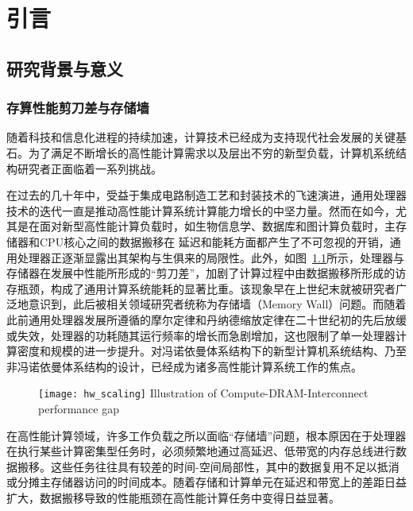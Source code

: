 \chapter{引言}\label{chap:Introduction}
\section{研究背景与意义}\label{sec:background_and_motivation}
    \subsection{存算性能剪刀差与存储墙}\label{subsec:memory_wall}

    随着科技和信息化进程的持续加速，计算技术已经成为支持现代社会发展的关键基石。为了满足不断增长的高性能计算需求以及层出不穷的新型负载，计算机系统结构研究者正面临着一系列挑战。  
    
    在过去的几十年中，受益于集成电路制造工艺和封装技术的飞速演进，通用处理器技术的迭代一直是推动高性能计算系统计算能力增长的中坚力量。然而在如今，尤其是在面对新型高性能计算负载时，如生物信息学、数据库和图计算负载时，主存储器和CPU核心之间的数据搬移在
    延迟\citep{hashemi_accelerating_nodate}和能耗\citep{pandiyan_quantifying_2014}方面都产生了不可忽视的开销，通用处理器正逐渐显露出其架构与生俱来的局限性。此外，如图~\ref{fig:hw_scaling}所示，处理器与存储器在发展中性能所形成的“剪刀差”，加剧了计算过程中由数据搬移所形成的访存瓶颈，构成了通用计算系统能耗的显著比重\citep{denning_exponential_2016}。该现象早在上世纪末就被研究者广泛地意识到，此后被相关领域研究者统称为存储墙（Memory Wall）\citep{wulf_hitting_1995}问题。而随着此前通用处理器发展所遵循的摩尔定律\citep{moore_cramming_1998}和丹纳德缩放定律\citep{dennard_design_nodate}在二十世纪初的先后放缓或失效，处理器的功耗随其运行频率的增长而急剧增加，这也限制了单一处理器计算密度和规模的进一步提升。对冯诺依曼体系结构下的新型计算机系统结构、乃至非冯诺依曼体系结构的设计，已经成为诸多高性能计算系统工作的焦点。
    
    \begin{figure}[!htbp]
        \centering
        \texttt{[image: hw\_scaling]}
        {\quad Illustration of Compute-DRAM-Interconnect performance gap\citep{gholami_ai_2023}}
        \label{fig:hw_scaling}
    \end{figure}
    
    在高性能计算领域，许多工作负载之所以面临“存储墙”问题，根本原因在于处理器在执行某些计算密集型任务时，必须频繁地通过高延迟、低带宽的内存总线进行数据搬移。这些任务往往具有较差的时间-空间局部性，其中的数据复用不足以抵消或分摊主存储器访问的时间成本。随着存储和计算单元在延迟和带宽上的差距日益扩大，数据搬移导致的性能瓶颈在高性能计算任务中变得日益显著。

